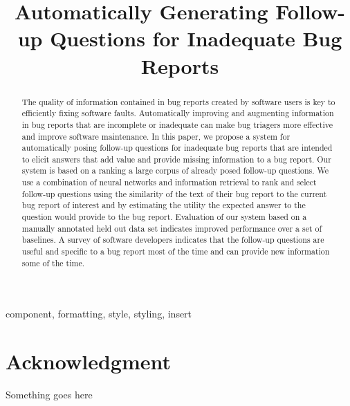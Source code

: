 \documentclass[10pt,conference]{IEEEtran}
\begin{document}
\title{Automatically Generating Follow-up Questions for Inadequate Bug Reports}

\author{
\and
{}
\and
{}
}

\maketitle

\begin{abstract}
The quality of information contained in bug reports created by software users is key
to efficiently fixing software faults.
%
Automatically improving and augmenting information in bug reports that are incomplete or
inadequate can make bug triagers more effective and improve software maintenance.
%
In this paper, we propose a system for automatically posing follow-up questions for
inadequate bug reports that are intended to elicit answers that add value and provide
missing information to a bug report.
%
Our system is based on a ranking a large corpus of already posed follow-up questions.
%
We use a combination of neural networks and information retrieval to rank and select
follow-up questions using the similarity of the text of their bug report to the current
bug report of interest and by estimating the utility the expected answer to the question would provide
to the bug report.
%
Evaluation of our system based on a manually annotated held out data set indicates improved
performance over a set of baselines.
%
A survey of software developers indicates that the follow-up questions are useful and specific to a bug
report most of the time and can provide new information some of the time.

\end{abstract}

\begin{IEEEkeywords}
component, formatting, style, styling, insert
\end{IEEEkeywords}











\section*{Acknowledgment}

Something goes here



\end{document}
